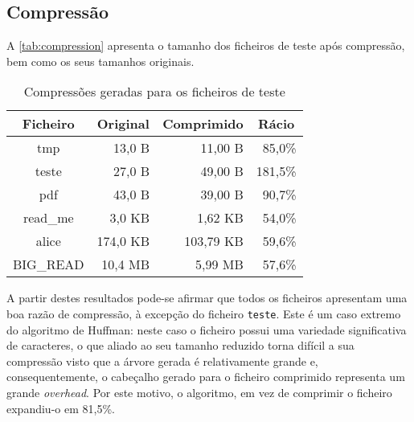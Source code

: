   \subsection{Compressão}

  A \autoref{tab:compression} apresenta o tamanho dos ficheiros de teste após compressão, bem como os seus tamanhos originais.

  \begin{table}[h]
    \centering
    \caption{Compressões geradas para os ficheiros de teste}
    \begin{tabular}{|c|r|r|r|}
        \hline
        \textbf{Ficheiro}                                 &
        \multicolumn{1}{c|}{\textbf{Original}}            &
        \multicolumn{1}{c|}{\textbf{Comprimido}}          &
        \multicolumn{1}{c|}{\textbf{Rácio}}\\ \hline \hline
        tmp        &  13,0  B    &  11,00 B          & 85,0\%     \\ \hline
        teste      &  27,0  B    &  49,00 B          & 181,5\%    \\ \hline
        pdf        &  43,0  B    &  39,00 B          & 90,7\%     \\ \hline
        read\_me   &  3,0  KB    &  1,62 KB          & 54,0\%     \\ \hline
        alice      &  174,0 KB   &  103,79 KB        & 59,6\%     \\ \hline
        BIG\_READ  &  10,4 MB    &  5,99 MB          & 57,6\%     \\
        \hline
    \end{tabular}
    \label{tab:compression}
  \end{table}

  A partir destes resultados pode-se afirmar que todos os ficheiros apresentam uma boa razão de compressão, à excepção do ficheiro \texttt{teste}. Este é um caso extremo do algoritmo de Huffman: neste caso o ficheiro possui uma variedade significativa de caracteres, o que aliado ao seu tamanho reduzido torna difícil a sua compressão visto que a árvore gerada é relativamente grande e, consequentemente, o cabeçalho gerado para o ficheiro comprimido representa um grande \textit{overhead}. Por este motivo, o algoritmo, em vez de comprimir o ficheiro expandiu-o em 81,5\%.
